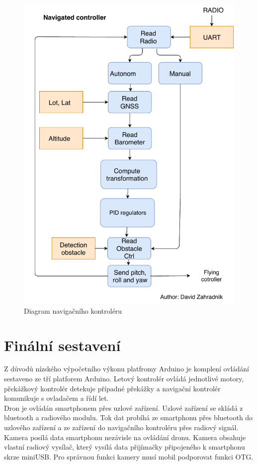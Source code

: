 \begin{figure}[h]
	\centering
	\includegraphics[width=14cm]{pictures/NaviDiagram.pdf}
	\caption{Diagram navigačního kontroléru}
\end{figure}

\section{Finální sestavení}
Z důvodů nízského výpočetního výkonu platfromy Arduino je komplení ovládání sestaveno ze tří platforem Arduino. Letový kontrolér ovládá jednotlivé motory, překážkový kontrolér detekuje případné překážky a navigační kontrolér komunikuje s ovladačem a řídí let.\\
Dron je ovládán smartphonem přes uzlové zařízení. Uzlové zařízení se skládá z bluetooth a radiového modulu. Tok dat probíhá ze smartphonu přes bluetooth do uzlového zařízení a ze zařízení do navigačního kontroléru přes radiový signál.\\
Kamera posílá data smartphonu nezávisle na ovládání dronu. Kamera obsahuje vlastní radiový vysílač, který vysílá data přijímačky připojeného k smartphonu skrze miniUSB. Pro správnou funkci kamery musí mobil podporovat funkci OTG.\\ 

